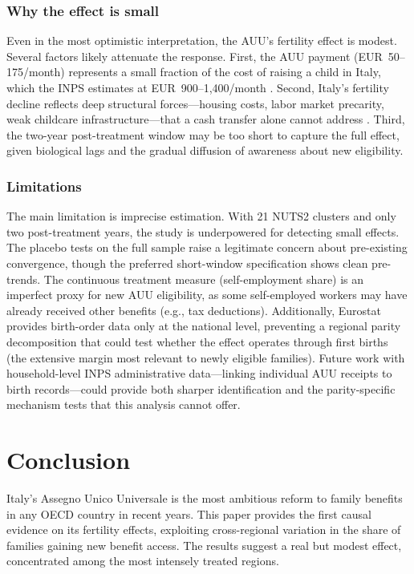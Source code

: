 \documentclass[12pt]{article}
\begin{document}
\subsubsection*{Why the effect is small} Even in the most optimistic interpretation, the AUU's fertility effect is modest. Several factors likely attenuate the response. First, the AUU payment (EUR~50--175/month) represents a small fraction of the cost of raising a child in Italy, which the INPS estimates at EUR~900--1,400/month \citep{istat2023childcosts}. Second, Italy's fertility decline reflects deep structural forces---housing costs, labor market precarity, weak childcare infrastructure---that a cash transfer alone cannot address \citep{adserà2004changing, goldstein2013three, derose2019european}. Third, the two-year post-treatment window may be too short to capture the full effect, given biological lags and the gradual diffusion of awareness about new eligibility.

\subsubsection*{Limitations} The main limitation is imprecise estimation. With 21 NUTS2 clusters and only two post-treatment years, the study is underpowered for detecting small effects. The placebo tests on the full sample raise a legitimate concern about pre-existing convergence, though the preferred short-window specification shows clean pre-trends. The continuous treatment measure (self-employment share) is an imperfect proxy for new AUU eligibility, as some self-employed workers may have already received other benefits (e.g., tax deductions). Additionally, Eurostat provides birth-order data only at the national level, preventing a regional parity decomposition that could test whether the effect operates through first births (the extensive margin most relevant to newly eligible families). Future work with household-level INPS administrative data---linking individual AUU receipts to birth records---could provide both sharper identification and the parity-specific mechanism tests that this analysis cannot offer.


\section{Conclusion}

Italy's Assegno Unico Universale is the most ambitious reform to family benefits in any OECD country in recent years. This paper provides the first causal evidence on its fertility effects, exploiting cross-regional variation in the share of families gaining new benefit access. The results suggest a real but modest effect, concentrated among the most intensely treated regions.
\end{document}
